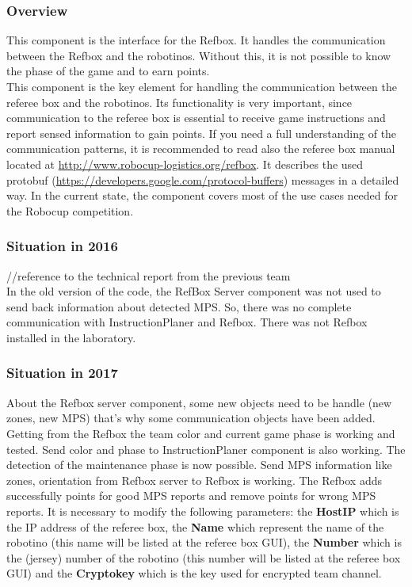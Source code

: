 
\subsubsection{Overview}

This component is the interface for the Refbox. It handles the communication between the Refbox and the robotinos. Without this, it is not possible to know the phase of the game and to earn points. \\

This component is the key element for handling the communication between the referee box and the robotinos. Its functionality is very important, since communication to the referee box is essential to receive game instructions and report sensed information to gain points. If you need a full understanding of the communication patterns, it is recommended to read also the referee box manual located at \url{ http://www.robocup-logistics.org/refbox}. It describes the used protobuf (\url{https://developers.google.com/protocol-buffers}) messages in a detailed way. In the current state, the component covers most of the use cases needed for the Robocup competition.
 

\subsubsection{Situation in 2016}

//reference to the technical report from the previous team \\

In the old version of the code, the RefBox Server component was not used to send back information about detected MPS. So, there was no complete communication with InstructionPlaner and Refbox. There was not Refbox installed in the laboratory. 


\subsubsection{Situation in 2017}

About the Refbox server component, some new objects need to be handle (new zones, new MPS) that's why some communication objects have been added. Getting from the Refbox the team color and current game phase is working and tested. Send color and phase to InstructionPlaner component is also working. The detection of the maintenance phase is now possible. Send MPS information like zones, orientation from Refbox server to Refbox is working. The Refbox adds successfully points for good MPS reports and remove points for wrong MPS reports. It is necessary to modify the following parameters: the \textbf{HostIP} which is the IP address of the referee box, the \textbf{Name} which represent the name of the robotino (this name will be listed at the referee box GUI), the \textbf{Number} which is the (jersey) number of the robotino (this number will be listed at the referee box GUI) and the \textbf{Cryptokey} which is the key used for encrypted team channel.\\

